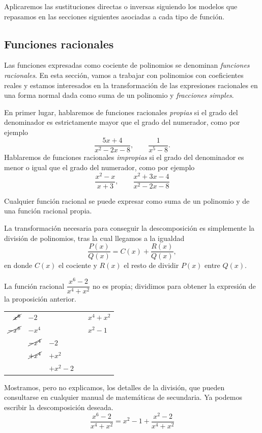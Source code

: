 Aplicaremos las sustituciones directas o inversas siguiendo los modelos que repasamos en las secciones siguientes asociadas a cada tipo de función.

\subsection{Funciones racionales}

Las funciones expresadas como cociente de polinomios se denominan \emph{funciones racionales}.
En esta sección, vamos a trabajar con polinomios con coeficientes reales y estamos interesados en la transformación de las expresiones racionales en una forma normal dada como suma de un polinomio y \emph{fracciones simples}.

En primer lugar, hablaremos de funciones racionales \emph{propias} si el grado del denominador es estrictamente mayor que el grado del numerador, como por ejemplo
\[
\dfrac{5x+4}{x^2-2x-8},\qquad \dfrac{1}{x^5-8}.
\]
Hablaremos de funciones racionales \emph{impropias} si el grado del denominador es menor o igual que el grado del numerador, como por ejemplo
\[
\dfrac{x^2-x}{x+3},\qquad \dfrac{x^2+3x-4}{x^2-2x-8}
\]
%
\begin{proposicion}
Cualquier función racional se puede expresar como suma de un polinomio y de una función racional propia.
\end{proposicion}
%
La transformación necesaria para conseguir la descomposición es simplemente la división de polinomios, tras la cual llegamos a la igualdad
\[
\frac{P(x)}{Q(x)} = C(x) + \frac{R(x)}{Q(x)},
\]
en donde $C(x)$ el cociente y $R(x)$ el resto de dividir $P(x)$ entre $Q(x)$.
%
\begin{ejemplo}
La función racional $\dfrac{x^6-2}{x^4+x^2}$ no es propia; dividimos para obtener la expresión de la proposición anterior.
\begin{center}
\begin{tabular}{rllcl}
$\cancel{x^6}$ & $-2$ &&& \multicolumn{1}{|l}{$x^4+x^2$} \\\cline{5-5}
$\cancel{-x^6}$ & $-x^4$ &&& $x^2-1$ \\\cline{1-2}
 & $\cancel{-x^4}$ & $-2$ \\
 & $\cancel{+x^4}$ & $+x^2$ \\\cline{2-3}
 &       &  $+x^2-2$
\end{tabular}
\end{center}
Mostramos, pero no explicamos, los detalles de la división, que pueden consultarse en cualquier manual de matemáticas de secundaria. Ya podemos escribir la descomposición deseada.
\[
\frac{x^6-2}{x^4+x^2} = x^2 - 1 + \frac{x^2-2}{x^4+x^2}\tag*{\fej}
\]
\end{ejemplo}
